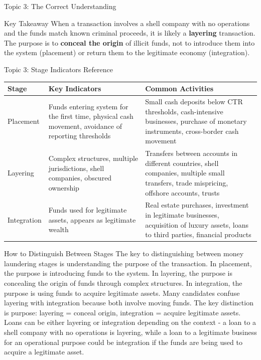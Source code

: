 \documentclass[5pt]{beamer}
\begin{document}
\begin{frame}{Topic 3: The Correct Understanding}
		\begin{alertblock}{Key Takeaway}
			\tiny When a transaction involves a shell company with no operations and the funds match known criminal proceeds, it is likely a \textbf{layering} transaction. The purpose is to \textbf{conceal the origin} of illicit funds, not to introduce them into the system (placement) or return them to the legitimate economy (integration).
		\end{alertblock}
	\end{frame}
	
	\begin{frame}{Topic 3: Stage Indicators Reference}
		\begin{center}
			\tiny
			\begin{tabular}{|p{1.8cm}|p{3.5cm}|p{2.5cm}|}
				\hline
				\rowcolor{lightgray}
				\textbf{Stage} & \textbf{Key Indicators} & \textbf{Common Activities} \\
				\hline
				Placement & Funds entering system for the first time, physical cash movement, avoidance of reporting thresholds & Small cash deposits below CTR thresholds, cash-intensive businesses, purchase of monetary instruments, cross-border cash movement \\
				\hline
				Layering & Complex structures, multiple jurisdictions, shell companies, obscured ownership & Transfers between accounts in different countries, shell companies, multiple small transfers, trade mispricing, offshore accounts, trusts \\
				\hline
				Integration & Funds used for legitimate assets, appears as legitimate wealth & Real estate purchases, investment in legitimate businesses, acquisition of luxury assets, loans to third parties, financial products \\
				\hline
			\end{tabular}
		\end{center}
		
		\begin{block}{\tiny How to Distinguish Between Stages}
			\tiny The key to distinguishing between money laundering stages is understanding the purpose of the transaction. In placement, the purpose is introducing funds to the system. In layering, the purpose is concealing the origin of funds through complex structures. In integration, the purpose is using funds to acquire legitimate assets. Many candidates confuse layering with integration because both involve moving funds. The key distinction is purpose: layering = conceal origin, integration = acquire legitimate assets. Loans can be either layering or integration depending on the context - a loan to a shell company with no operations is layering, while a loan to a legitimate business for an operational purpose could be integration if the funds are being used to acquire a legitimate asset.
		\end{block}
	\end{frame}
	
\end{document}
